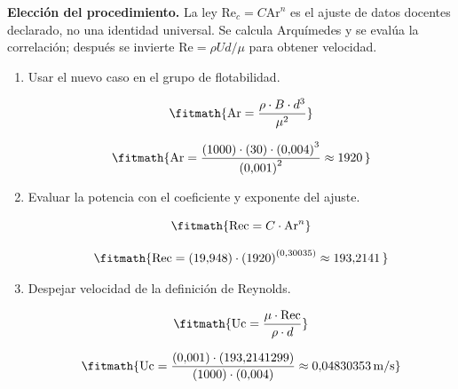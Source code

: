 \noindent\textbf{Elección del procedimiento.} La ley $\mathrm{Re}_c=C\mathrm{Ar}^n$ es el ajuste de datos docentes declarado, no una identidad universal. Se calcula Arquímedes y se evalúa la correlación; después se invierte $\mathrm{Re}=\rho Ud/\mu$ para obtener velocidad.

\begin{enumerate}

\item Usar el nuevo caso en el grupo de flotabilidad.

\[\fitmath{\mathrm{Ar}=\frac{\rho\cdot B\cdot {d}^{3}}{{\mu}^{2}}}\]

\[\fitmath{\mathrm{Ar}=\frac{(1000)\cdot (30)\cdot {(0{,}004)}^{3}}{{(0{,}001)}^{2}}\approx 1920\,}\]

\item Evaluar la potencia con el coeficiente y exponente del ajuste.

\[\fitmath{\mathrm{Rec}=C\cdot {\mathrm{Ar}}^{n}}\]

\[\fitmath{\mathrm{Rec}=(19{,}948)\cdot {(1920)}^{(0{,}30035)}\approx 193{,}2141\,}\]

\item Despejar velocidad de la definición de Reynolds.

\[\fitmath{\mathrm{Uc}=\frac{\mu\cdot \mathrm{Rec}}{\rho\cdot d}}\]

\[\fitmath{\mathrm{Uc}=\frac{(0{,}001)\cdot (193{,}2141299)}{(1000)\cdot (0{,}004)}\approx 0{,}04830353\,\mathrm{m/s}}\]

\end{enumerate}
